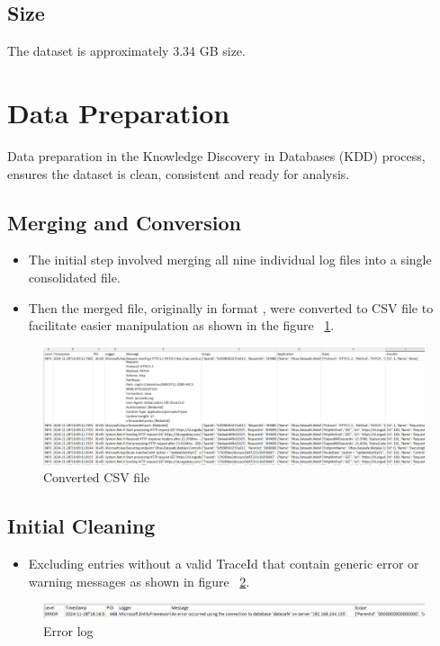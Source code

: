 \subsection{Size}
The dataset is approximately 3.34 GB size.

\section{Data Preparation}
Data preparation in the Knowledge Discovery in Databases (KDD) process, ensures the dataset is clean, consistent and ready for analysis. 

\subsection{Merging and Conversion}
\begin{itemize}
	\item The initial step involved merging all nine individual log files into a single consolidated file. 
	\item Then the merged file, originally in format , were converted to CSV file to facilitate easier manipulation as shown in the figure ~\ref{csvFile}.
\end{itemize}

\begin{figure}
	\begin{center}
		\includegraphics[width=0.9\linewidth]{Images/csvFile.png}
		\caption{Converted CSV file}
		\label{csvFile} 
	\end{center}
\end{figure}

\subsection{Initial Cleaning}
\begin{itemize} 
	\item Excluding entries without a valid TraceId that contain generic error or warning messages as shown in figure ~\ref{error}.
\end{itemize}
\begin{figure}
	\begin{center}
		\includegraphics[width=0.9\linewidth]{Images/error.png}
		\caption{Error log}
		\label{error} 
	\end{center}
\end{figure}

